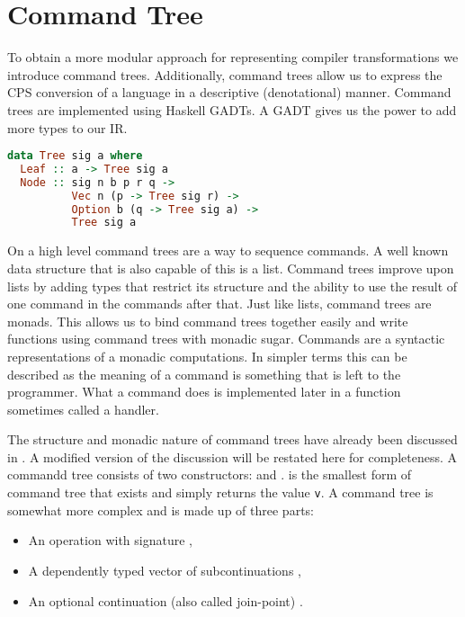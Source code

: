 
\chapter{\label{chap:commandtree}Command Tree}
To obtain a more modular approach for representing compiler transformations we introduce command trees\autocite{commandtreespoulsen}. Additionally, command trees allow us to express the \ac{CPS} conversion of a language in a descriptive (denotational) manner. Command trees are implemented using Haskell \acp{GADT}. A \ac{GADT} gives us the power to add more types to our \ac{IR}.

\begin{lstlisting}[language=Haskell]
data Tree sig a where
  Leaf :: a -> Tree sig a
  Node :: sig n b p r q ->
          Vec n (p -> Tree sig r) ->
          Option b (q -> Tree sig a) ->
          Tree sig a
\end{lstlisting}

On a high level command trees are a way to sequence commands. A well known data structure that is also capable of this is a list. Command trees improve upon lists by adding types that restrict its structure and the ability to use the result of one command in the commands after that. Just like lists, command trees are monads. This allows us to bind command trees together easily and write functions using command trees with monadic sugar. Commands are a syntactic representations of a monadic computations. In simpler terms this can be described as the meaning of a command is something that is left to the programmer. What a command does is implemented later in a function sometimes called a handler.

The structure and monadic nature of command trees have already been discussed in . A modified version of the discussion will be restated here for completeness. A commandd tree consists of two constructors:  and .  is the smallest form of command tree that exists and simply returns the value \lstinline{v}. A  command tree is somewhat more complex and is made up of three parts:

\begin{itemize}
\item An operation  with signature ,
\item A dependently typed vector of subcontinuations ,
\item An optional continuation (also called join-point) .
\end{itemize}

